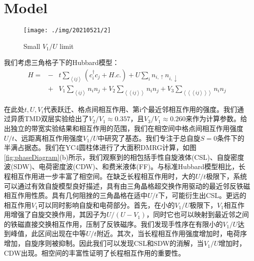 \documentclass[reprint, aps, prb, showkeys]{revtex4-2}
\begin{document}
\section{Model}
\begin{figure}[t]
    \texttt{[image: ./img/20210521/2]}
    \caption{\label{fig:smallV1ULimit} 
    Small $V_1/U$ limit
    }
\end{figure}
我们考虑三角格子下的Hubbard模型：
\begin{eqnarray}
    H = &-&t \sum_{\left\langle ij \right\rangle} \left( c_i^{\dagger}c_j + H.c. \right) + U \sum_i n_{i, \uparrow} n_{i, \downarrow} \nonumber \\
    &+& V_1 \sum_{\left\langle i j \right\rangle} n_i n_j + V_2 \sum_{\left\langle \left\langle i j \right\rangle \right\rangle} n_i n_j + V_3 \sum_{\left\langle \left\langle  \left\langle i j \right\rangle \right\rangle \right\rangle} n_i n_j
\end{eqnarray}

在此处$t, U, V_i$代表跃迁、格点间相互作用、第i个最近邻相互作用的强度。我们通过异质TMD双层实验给出了$V_2/V_1 \approx 0.357$，且$V_3/V_1 \approx 0.260$来作为计算参数。给出独立的带宽实验结果和相互作用的范围，我们在相空间中格点间相互作用强度$U/t$、远距离相互作用强度$V_1/U$中研究了基态。我们专注于总自旋$S = 0$条件下的半满占据态。我们在YC4圆柱体进行了大面积DMRG计算，如图\ref{fig:phaseDiagram}(b)所示，我们观察到的相包括手性自旋液体(CSL)、自旋密度波(SDW)、电荷密度波(CDW)、和费米液体(FF)。与标准Hubbard模型相比，长程相互作用进一步丰富了相空间。在缺乏长程相互作用时，大的$U/t$极限下，系统可以通过有效自旋模型良好描述，具有由三角晶格超交换作用驱动的最近邻反铁磁相互作用性质。具有几何阻挫的三角晶格在适中$U/t$下，可能衍生出CSL。更远的相互作用$V_1$可以同时影响自旋和电荷部分。首先，在小的$V_1/U$极限下，$V_1$相互作用增强了自旋交换作用，其因子为$U/(U-V_1)$，同时它也可以映射到最近邻之间的铁磁直接交换相互作用，压制了反铁磁序。我们发现手性序在有限小的$V_1/U$达到峰值，此区间出现在中等$U/t$附近。其次，当长程相互作用强度增加时，电荷序增加，自旋序则被抑制。因此我们可以发现CSL和SDW的消解，当$V_1/U$增加时，CDW出现。相空间的丰富性证明了长程相互作用的重要性。
\end{document}
